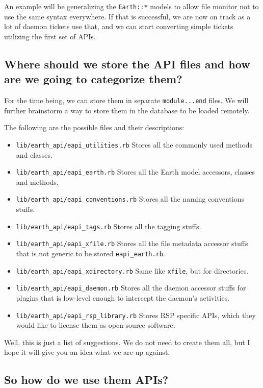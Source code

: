 \documentclass{article}
\begin{document}
An example will be generalizing the \texttt{Earth::*} models to allow file monitor not to use the same syntax everywhere. If that is successful, we are now on track as a lot of daemon tickets use that, and we can start converting simple tickets utilizing the first set of APIs. 

\subsection*{Where should we store the API files and how are we going to categorize them?}

For the time being, we can store them in separate \texttt{module...end} files. We will further brainstorm a way to store them in the database to be loaded remotely. 

The following are the possible files and their descriptions:

\begin{itemize}
	\item \texttt{lib/earth\_api/eapi\_utilities.rb} Stores all the commonly used methods and classes.  
	\item \texttt{lib/earth\_api/eapi\_earth.rb} Stores all the Earth model accessors, classes and methods.
	\item \texttt{lib/earth\_api/eapi\_conventions.rb} Stores all the naming conventions stuffs.
	\item \texttt{lib/earth\_api/eapi\_tags.rb} Stores all the tagging stuffs.
	\item \texttt{lib/earth\_api/eapi\_xfile.rb} Stores all the file metadata accessor stuffs that is not generic to be stored \texttt{eapi\_earth.rb}.
	\item \texttt{lib/earth\_api/eapi\_xdirectory.rb} Same like \texttt{xfile}, but for directories.
	\item \texttt{lib/earth\_api/eapi\_daemon.rb} Stores all the daemon accessor stuffs for plugins that is low-level enough to intercept the daemon's activities. 
	\item \texttt{lib/earth\_api/eapi\_rsp\_library.rb} Stores RSP specific APIs, which they would like to license them as open-source software.
\end{itemize}

Well, this is just a list of suggestions. We do not need to create them all, but I hope it will give you an idea what we are up against. 

\subsection*{So how do we use them APIs?}
\end{document}
